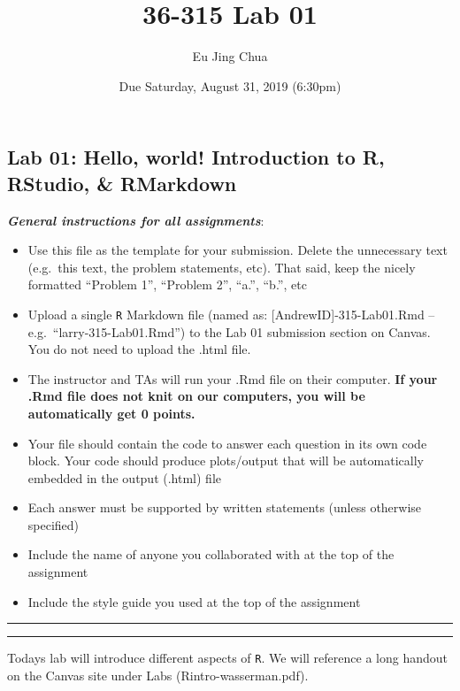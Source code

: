 \documentclass[]{article}
\title{36-315 Lab 01}
\author{Eu Jing Chua}
\date{Due Saturday, August 31, 2019 (6:30pm)}
\begin{document}
\maketitle

\hypertarget{lab-01-hello-world-introduction-to-r-rstudio-rmarkdown}{%
\subsection{Lab 01: Hello, world! Introduction to R, RStudio, \&
RMarkdown}\label{lab-01-hello-world-introduction-to-r-rstudio-rmarkdown}}

\textbf{\emph{General instructions for all assignments}}:

\begin{itemize}
\item
  Use this file as the template for your submission. Delete the
  unnecessary text (e.g.~this text, the problem statements, etc). That
  said, keep the nicely formatted ``Problem 1'', ``Problem 2'', ``a.'',
  ``b.'', etc
\item
  Upload a single \texttt{R} Markdown file (named as:
  {[}AndrewID{]}-315-Lab01.Rmd -- e.g.~``larry-315-Lab01.Rmd'') to the
  Lab 01 submission section on Canvas. You do not need to upload the
  .html file.
\item
  The instructor and TAs will run your .Rmd file on their computer.
  \textbf{If your .Rmd file does not knit on our computers, you will be
  automatically get 0 points.}
\item
  Your file should contain the code to answer each question in its own
  code block. Your code should produce plots/output that will be
  automatically embedded in the output (.html) file
\item
  Each answer must be supported by written statements (unless otherwise
  specified)
\item
  Include the name of anyone you collaborated with at the top of the
  assignment
\item
  Include the style guide you used at the top of the assignment
\end{itemize}

\begin{center}\rule{0.5\linewidth}{\linethickness}\end{center}

\begin{center}\rule{0.5\linewidth}{\linethickness}\end{center}

Todays lab will introduce different aspects of \texttt{R}. We will
reference a long handout on the Canvas site under Labs
(Rintro-wasserman.pdf).
\end{document}
